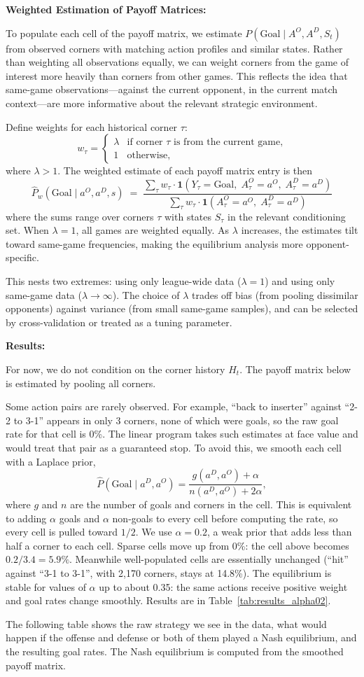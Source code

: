 \documentclass[11pt,english]{article}
\begin{document}
\noindent \textbf{Weighted Estimation of Payoff Matrices:}

To populate each cell of the payoff matrix, we estimate $P(\text{Goal} \mid A^O, A^D, S_t)$ from observed corners with matching action profiles and similar states. Rather than weighting all observations equally, we can weight corners from the game of interest more heavily than corners from other games. This reflects the idea that same-game observations---against the current opponent, in the current match context---are more informative about the relevant strategic environment.

Define weights for each historical corner $\tau$:
\[
w_\tau =
\begin{cases}
\lambda & \text{if corner } \tau \text{ is from the current game,} \\
1 & \text{otherwise,}
\end{cases}
\]
where $\lambda > 1$. The weighted estimate of each payoff matrix entry is then
\[
\hat{P}_w(\text{Goal} \mid a^O, a^D, s)
\;=\;
\frac{
\displaystyle\sum_{\tau} w_\tau \cdot \mathbf{1}\!\left(Y_\tau = \text{Goal},\; A_\tau^O = a^O,\; A_\tau^D = a^D\right)
}{
\displaystyle\sum_{\tau} w_\tau \cdot \mathbf{1}\!\left(A_\tau^O = a^O,\; A_\tau^D = a^D\right)
}
\]
where the sums range over corners $\tau$ with states $S_\tau$ in the relevant conditioning set. When $\lambda = 1$, all games are weighted equally. As $\lambda$ increases, the estimates tilt toward same-game frequencies, making the equilibrium analysis more opponent-specific.

This nests two extremes: using only league-wide data ($\lambda = 1$) and using only same-game data ($\lambda \to \infty$). The choice of $\lambda$ trades off bias (from pooling dissimilar opponents) against variance (from small same-game samples), and can be selected by cross-validation or treated as a tuning parameter.


\noindent \textbf{Results:}

For now, we do not condition on the corner history $H_t$. The payoff matrix below is estimated by pooling all corners.

Some action pairs are rarely observed. For example, ``back to inserter'' against ``2-2 to 3-1'' appears in only 3 corners, none of which were goals, so the raw goal rate for that cell is 0\%. The linear program takes such estimates at face value and would treat that pair as a guaranteed stop. To avoid this, we smooth each cell with a Laplace prior,
\[
\hat{P}(\text{Goal} \mid a^D, a^O) = \frac{g(a^D, a^O) + \alpha}{n(a^D, a^O) + 2\alpha},
\]
where $g$ and $n$ are the number of goals and corners in the cell. This is equivalent to adding $\alpha$ goals and $\alpha$ non-goals to every cell before computing the rate, so every cell is pulled toward $1/2$. We use $\alpha = 0.2$, a weak prior that adds less than half a corner to each cell. Sparse cells move up from 0\%: the cell above becomes $0.2/3.4 = 5.9\%$. Meanwhile well-populated cells are essentially unchanged (``hit'' against ``3-1 to 3-1'', with 2{,}170 corners, stays at 14.8\%). The equilibrium is stable for values of $\alpha$ up to about 0.35: the same actions receive positive weight and goal rates change smoothly. Results are in Table~\ref{tab:results_alpha02}.


The following table shows the raw strategy we see in the data, what would happen if the offense and defense or both of them played a Nash equilibrium, and the resulting goal rates. The Nash equilibrium is computed from the smoothed payoff matrix.

\end{document}
